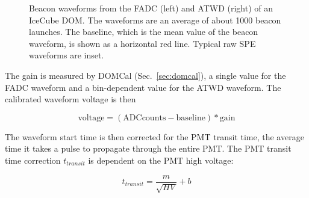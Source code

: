 \begin{figure}[!h]
  \captionsetup[subfigure]{labelformat=empty}
  \centering
  \caption{Beacon waveforms from the FADC (left) and ATWD (right) of
    an IceCube DOM. The waveforms are an average of about 1000 beacon
   launches. The baseline, which is the mean value of the
    beacon waveform, is shown as a horizontal red line. Typical raw SPE
    waveforms are inset.}
  \label{fig:raw_baselines}
\end{figure}

The gain is measured by DOMCal (Sec.~\ref{sec:domcal}), a single value
for the FADC waveform and a bin-dependent value for the ATWD
waveform. The calibrated waveform voltage is then

\begin{equation}
  \mathrm{voltage} = \mathrm{(ADC  counts - baseline)*gain}
\end{equation}

The waveform start time is then corrected for the PMT transit time,
the average time it takes a pulse to propagate through the entire
PMT. The PMT transit time correction $t_{transit}$ is dependent on the PMT high
voltage:

\begin{equation}
  t_{transit} = \frac{m}{\sqrt{HV}} + b
\end{equation}

